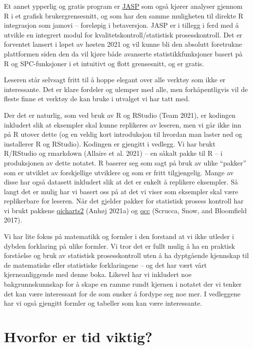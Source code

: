 \documentclass[
]{book}
\begin{document}
Et annet ypperlig og gratis program er \href{Et\%20annet\%20ypperlig\%20og\%20gratis\%20program\%20er}{JASP} som også kjører analyser gjennom R i et grafisk brukergrensesnitt, og som har den samme muligheten til direkte R integrasjon som jamovi -- foreløpig i betaversjon. JASP er i tillegg i ferd med å utvikle en integrert modul for kvalitetskontroll/statistisk prosesskontroll. Det er forventet lansert i løpet av høsten 2021 og vil kunne bli den absolutt foretrukne plattformen siden den da vil kjøre både avanserte statistikkfunksjoner basert på R og SPC-funksjoner i et intuitivt og flott grensesnitt, og er gratis.

Leseren står selvsagt fritt til å hoppe elegant over alle verktøy som ikke er interessante. Det er klare fordeler og ulemper med alle, men forhåpentligvis vil de fleste finne et verktøy de kan bruke i utvalget vi har tatt med.

Der det er naturlig, som ved bruk av R og RStudio (Team 2021), er kodingen inkludert slik at eksempler skal kunne replikeres av leseren, men vi går ikke inn på R utover dette (og en veldig kort introduksjon til hvordan man laster ned og installerer R og RStudio). Kodingen er gjengitt i vedlegg. Vi har brukt R/RStudio og rmarkdown (Allaire et al. 2021) -- en såkalt pakke til R -- i produksjonen av dette notatet. R baserer seg som sagt på bruk av ulike ``pakker'' som er utviklet av forskjellige utviklere og som er fritt tilgjengelig. Mange av disse har også datasett inkludert slik at det er enkelt å replikere eksempler. Så langt det er mulig har vi basert oss på at det vi viser som eksempler skal være replikerbare for leseren. Når det gjelder pakker for statistisk prosess kontroll har vi brukt pakkene \href{https://anhoej.github.io/qicharts2/}{qicharts2} (Anhøj 2021a) og \href{https://luca-scr.github.io/qcc/articles/qcc.html}{qcc} (Scrucca, Snow, and Bloomfield 2017).

Vi har lite fokus på matematikk og formler i den forstand at vi ikke utleder i dybden forklaring på ulike formler. Vi tror det er fullt mulig å ha en praktisk forståelse og bruk av statistisk prosesskontroll uten å ha dyptgående kjennskap til de matematiske eller statistiske forklaringene -- og det har vært vårt kjerneanliggende med denne boka. Likevel har vi inkludert noe bakgrunnskunnskap for å skape en
ramme rundt kjernen i notatet der vi tenker det kan være interessant for de som ønsker å fordype seg noe mer. I vedleggene har vi også gjengitt formler og tabeller som kan være interessante.

\hypertarget{hvorfor-er-tid-viktig}{%
\chapter{Hvorfor er tid viktig?}\label{hvorfor-er-tid-viktig}}
\end{document}
